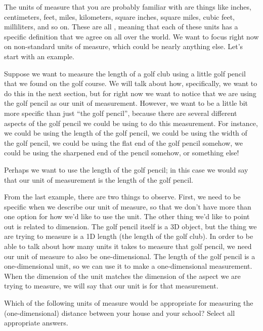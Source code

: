 \documentclass{ximera}
\begin{document}
The units of measure that you are probably familiar with are things like inches, centimeters, feet, miles, kilometers, square inches, square miles, cubic feet, milliliters, and so on. These are all , meaning that each of these units has a specific definition that we agree on all over the world. We want to focus right now on non-standard units of measure, which could be nearly anything else. Let's start with an example.
\begin{example}
Suppose we want to measure the length of a golf club using a little golf pencil that we found on the golf course. We will talk about how, specifically, we want to do this in the next section, but for right now we want to notice that we are using the golf pencil as our unit of measurement. However, we want to be a little bit more specific than just ``the golf pencil'', because there are several different aspects of the golf pencil we could be using to do this measurement. For instance, we could be using the length of the golf pencil, we could be using the width of the golf pencil, we could be using the flat end of the golf pencil somehow, we could be using the sharpened end of the pencil somehow, or something else!

Perhaps we want to use the length of the golf pencil; in this case we would say that our unit of measurement is the length of the golf pencil.
\end{example}

From the last example, there are two things to observe. First, we need to be specific when we describe our unit of measure, so that we don't have more than one option for how we'd like to use the unit. The other thing we'd like to point out is related to dimension. The golf pencil itself is a 3D object, but the thing we are trying to measure is a 1D length (the length of the golf club). In order to be able to talk about how many units it takes to measure that golf pencil, we need our unit of measure to also be one-dimensional. The length of the golf pencil is a one-dimensional unit, so we can use it to make a one-dimensional measurement. When the dimension of the unit matches the dimension of the aspect we are trying to measure, we will say that our unit is  for that measurement.

\begin{question}
Which of the following units of measure would be appropriate for measuring the (one-dimensional) distance between your house and your school? Select all appropriate answers.
\begin{selectAll}
\end{selectAll}
\end{question}
\end{document}
